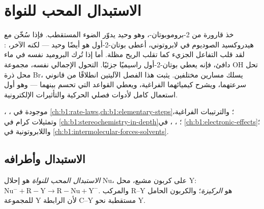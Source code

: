 \chapter{الاستبدال المحب للنواة}\label{ch:b1:nucleophilic-substitution}

خذ قارورة من 2-بروموبوتان-، وهو  وحيد يدوّر
الضوء المستقطب. فإذا سُخّن مع هيدروكسيد الصوديوم في  لابروتوني،
أعطى بوتان-2-أول هو أيضًا  وحيد --- لكنه
الآخر، : لقد قلب التفاعل الجزيء كما تقلب الريح
مظلة. أما إذا تُرك البروميد نفسه في ماء دافئ، فإنه يعطي
بوتان-2-أول راسيميًا جزئيًا. التحول الإجمالي نفسه، مجموعة OH
تحل محل ذرة Br، يسلك مسارين مختلفين. يثبت هذا الفصل
الآليتين انطلاقًا من قانوني سرعتهما، ويشرح
كيميائهما الفراغية، ويعطي القواعد التي تحسم بينهما --- وهو أول
استعمال كامل لأدوات فصلي الحركية والتأثيرات
الإلكترونية.

\begin{recall}
، ، 
 موجودة في \cref{ch:b1:rate-laws,ch:b1:elementary-steps}؛
والترتيبات الفراغية، وتمثيلات كرام  في
\cref{ch:b1:stereochemistry-in-depth}؛ ، ،
  في \cref{ch:b1:electronic-effects}؛
 واللابروتونية في \cref{ch:b1:intermolecular-forces-solvents}.
\end{recall}

\section{الاستبدال وأطرافه}

\begin{definition}\label{def:b1:nucleophilic-substitution:substitution}
\emph{الاستبدال المحب للنواة} هو
إحلال  Nu، على كربون مشبع، محل  Y:
$\mathrm{Nu^-} + \mathrm{R{-}Y} \to \mathrm{R{-}Nu} +
\mathrm{Y^-}$. والمركب R--Y هو \emph{الركيزة}؛
والكربون الحامل للمجموعة Y  لأن الرابطة C--Y مستقطبة
نحو Y.
\end{definition}

